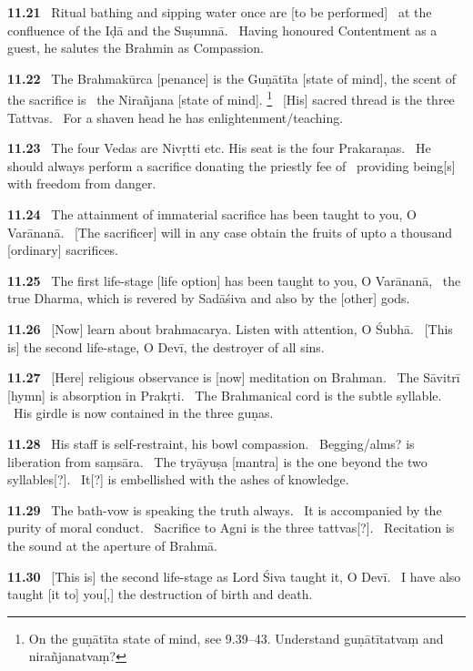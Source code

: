 \documentclass{article}
\begin{document}
\textbf{11.21}%
\ Ritual bathing and sipping water once are [to be performed]%
\              at the confluence of the Iḍā and the Suṣumnā.%
\ Having honoured Contentment as a guest, he salutes the Brahmin as Compassion.%


\textbf{11.22}%
\ The Brahmakūrca [penance] is the Guṇātīta [state of mind], the scent of the sacrifice is%
\                 the Nirañjana [state of mind].%
\footnote{On the guṇātīta state of mind, see 9.39--43.                 Understand guṇātītatvaṃ and nirañjanatvaṃ? }%
\ [His] sacred thread is the three Tattvas.%
\                      For a shaven head he has enlightenment/teaching.%


\textbf{11.23}%
\ The four Vedas are Nivṛtti etc. His seat is the four Prakaraṇas.%
\ He should always perform a sacrifice donating the priestly fee of%
\              providing being[s] with freedom from danger.%


\textbf{11.24}%
\ The attainment of immaterial sacrifice has been taught to you, O Varānanā.%
\ [The sacrificer] will in any case obtain the fruits of upto a thousand [ordinary] sacrifices.%


\textbf{11.25}%
\ The first life-stage [life option] has been taught to you, O Varānanā,%
\ the true Dharma, which is revered by Sadāśiva and also by the [other] gods.%


\textbf{11.26}%
\ [Now] learn about brahmacarya. Listen with attention, O Śubhā.%
\ [This is] the second life-stage, O Devī, the destroyer of all sins.%


\textbf{11.27}%
\ [Here] religious observance is [now] meditation on Brahman.%
\              The Sāvitrī [hymn] is absorption in Prakṛti.%
\ The Brahmanical cord is the subtle syllable.%
\              His girdle is now contained in the three guṇas.%


\textbf{11.28}%
\ His staff is self-restraint, his bowl compassion.%
\                         Begging/alms? is liberation from saṃsāra.%
\ The tryāyuṣa [mantra] is the one beyond the two syllables[?].%
\              It[?] is embellished with the ashes of knowledge.%


\textbf{11.29}%
\ The bath-vow is speaking the truth always.%
\              It is accompanied by the purity of moral conduct.%
\ Sacrifice to Agni is the three tattvas[?].%
\                 Recitation is the sound at the aperture of Brahmā.%


\textbf{11.30}%
\ [This is] the second life-stage as Lord Śiva taught it, O Devī.%
\ I have also taught [it to] you[,] the destruction of birth and death.%
\end{document}
